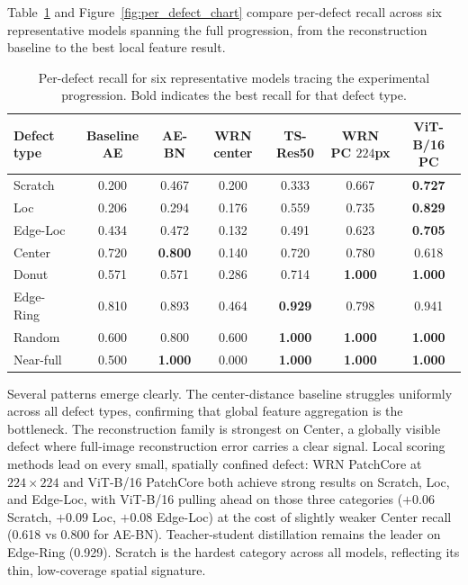 \documentclass[11pt]{article}
\begin{document}
Table~\ref{tab:per_defect} and Figure~\ref{fig:per_defect_chart} compare
per-defect recall across six representative models spanning the full
progression, from the reconstruction baseline to the best local feature result.

\begin{table}[H]
\centering
\caption{Per-defect recall for six representative models tracing the experimental
progression. Bold indicates the best recall for that defect type.}
\label{tab:per_defect}
\begin{tabular}{lcccccc}
\toprule
Defect type
  & Baseline AE
  & AE-BN
  & WRN center
  & TS-Res50
  & WRN PC $224$px
  & ViT-B/16 PC \\
\midrule
Scratch   & 0.200 & 0.467 & 0.200 & 0.333 & 0.667 & \textbf{0.727} \\
Loc       & 0.206 & 0.294 & 0.176 & 0.559 & 0.735 & \textbf{0.829} \\
Edge-Loc  & 0.434 & 0.472 & 0.132 & 0.491 & 0.623 & \textbf{0.705} \\
Center    & 0.720 & \textbf{0.800} & 0.140 & 0.720 & 0.780 & 0.618 \\
Donut     & 0.571 & 0.571 & 0.286 & 0.714 & \textbf{1.000} & \textbf{1.000} \\
Edge-Ring & 0.810 & 0.893 & 0.464 & \textbf{0.929} & 0.798 & 0.941 \\
Random    & 0.600 & 0.800 & 0.600 & \textbf{1.000} & \textbf{1.000} & \textbf{1.000} \\
Near-full & 0.500 & \textbf{1.000} & 0.000 & \textbf{1.000} & \textbf{1.000} & \textbf{1.000} \\
\bottomrule
\end{tabular}
\end{table}

Several patterns emerge clearly. The center-distance baseline struggles
uniformly across all defect types, confirming that global feature aggregation
is the bottleneck. The reconstruction family is strongest on Center, a globally
visible defect where full-image reconstruction error carries a clear signal.
Local scoring methods lead on every small, spatially confined defect:
WRN PatchCore at $224\!\times\!224$ and ViT-B/16 PatchCore both achieve
strong results on Scratch, Loc, and Edge-Loc, with ViT-B/16 pulling ahead on
those three categories ($+0.06$ Scratch, $+0.09$ Loc, $+0.08$ Edge-Loc) at
the cost of slightly weaker Center recall (0.618 vs 0.800 for AE-BN).
Teacher-student distillation remains the leader on Edge-Ring (0.929).
Scratch is the hardest category across all models,
reflecting its thin, low-coverage spatial signature.
\end{document}
